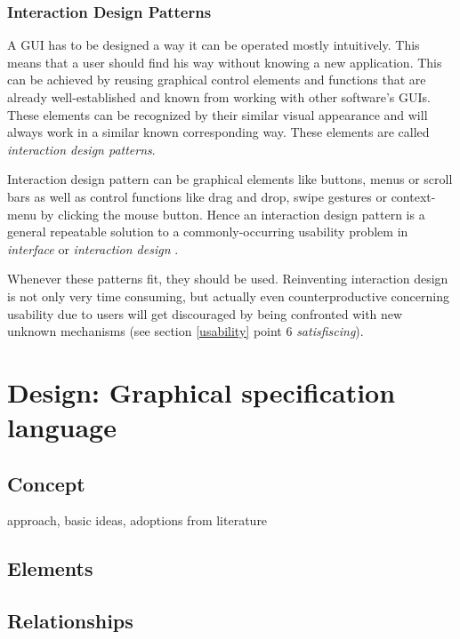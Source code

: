 \documentclass[twoside, openright, 12pt]{book}
\begin{document}
\subsection{Interaction Design Patterns}
\label{design_patterns}
A GUI has to be designed a way it can be operated mostly intuitively.
This means that a user should find his way without knowing a new application.
This can be achieved by reusing graphical control elements and functions that are already well-established and known from working with other software's GUIs.
These elements can be recognized by their similar visual appearance and will always work in a similar known corresponding way.
These elements are called \textit{interaction design patterns}.

Interaction design pattern can be graphical elements like buttons, menus or scroll bars as well as control functions like drag and drop, swipe gestures or context-menu by clicking the mouse button.
Hence an interaction design pattern is a general repeatable solution to a commonly-occurring usability problem in \textit{interface} or \textit{interaction design} \citep{Folmer}.

Whenever these patterns fit, they should be used.
Reinventing interaction design is not only very time consuming, but actually even counterproductive concerning usability due to users will get discouraged by being confronted with new unknown mechanisms (see section \ref{usability} point 6 \textit{satisfiscing}).



\cleardoublepage
\chapter{Design: Graphical specification language}
\label{gsl_design}


\section{Concept}
\label{gsl_concept}
approach, basic ideas, adoptions from literature

\section{Elements}
\label{gsl_elements}


\section{Relationships}
\label{gsl_relationships}
\end{document}

